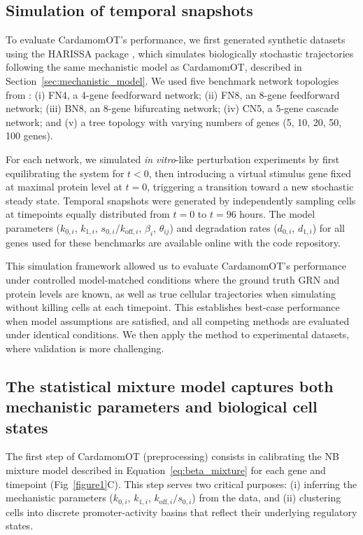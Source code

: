 \documentclass[a4paper, 11pt]{article}
\theoremstyle{plain}
\theoremstyle{remark}
\newcommand*{\firstreview}[1]{{\color{black}#1}}
\begin{document}
\subsection{Simulation of temporal snapshots}
\label{subsec:simulation_temporal_snapshots}

To evaluate CardamomOT's performance, we first generated synthetic datasets using the HARISSA package \cite{herbach2024harissa}, which simulates \firstreview{biologically stochastic trajectories following the same} mechanistic model \firstreview{as CardamomOT,} described in Section~\ref{sec:mechanistic_model}. We used five benchmark network topologies from \cite{ventre2023one}: (i) FN4, a 4-gene feedforward network; (ii) FN8, an 8-gene feedforward network; (iii) BN8, an 8-gene bifurcating network; (iv) CN5, a 5-gene cascade network; and (v) a tree topology with varying numbers of genes (5, 10, 20, 50, 100 genes).

For each network, we simulated \emph{in vitro}-like perturbation experiments by first equilibrating the system for $t<0$, then introducing a virtual stimulus gene fixed at maximal protein level at $t=0$, triggering a transition toward a new stochastic steady state. Temporal snapshots were generated by independently sampling cells at timepoints \firstreview{equally distributed} from $t=0$ to $t=96$ hours. The model parameters ($k_{0,i}$, $k_{1,i}$, $s_{0,i}/k_{\mathrm{off},i}$, $\beta_i$, $\theta_{ij}$) and degradation rates ($d_{0,i}$, $d_{1,i}$) for all genes used for these benchmarks are available online with the code repository.

This simulation framework allowed us to evaluate CardamomOT's performance under controlled \firstreview{model-matched} conditions where the ground truth GRN and protein levels are known, as well as true cellular trajectories when simulating without killing cells at each timepoint. \firstreview{This establishes best-case performance when model assumptions are satisfied, and all competing methods are evaluated under identical
conditions.} We then apply the method to experimental datasets, where validation is more challenging.

\subsection{The statistical mixture model captures both mechanistic parameters and biological cell states}
\label{subsec:statistical_model_validation}

The first step of CardamomOT (preprocessing) consists in calibrating the NB mixture model described in Equation~\eqref{eq:beta_mixture} for each gene and timepoint (Fig~\ref{figure1}C). This step serves two critical purposes: (i) inferring the mechanistic parameters ($k_{0,i}$, $k_{1,i}$, $k_{\mathrm{off},i}/s_{0,i}$) from the data, and (ii) clustering cells into discrete promoter-activity basins that reflect their underlying regulatory states.
\end{document}
